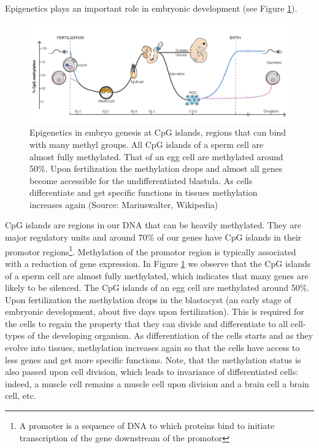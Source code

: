 \documentclass[
  11pt,
]{book}
\begin{document}
Epigenetics plays an important role in embryonic development (see Figure \ref{fig:epiEmbryo}).



\begin{figure}

{\centering \includegraphics[width=1\linewidth]{./figs/DNA_methylation_reprogramming} 

}

\caption{Epigenetics in embryo genesis at CpG islands, regions that can bind with many methyl groups. All CpG islands of a sperm cell are almost fully methylated. That of an egg cell are methylated around 50\%. Upon fertilization the methylation drops and almost all genes become accessible for the undifferentiated blastula. As cells differentiate and get specific functions in tissues methylation increases again (Source: Mariuswalter, Wikipedia)}\label{fig:epiEmbryo}
\end{figure}

CpG islands are regions in our DNA that can be heavily methylated. They are major regulatory units and around 70\% of our genes have CpG islands in their promotor regions\footnote{A promoter is a sequence of DNA to which proteins bind to initiate transcription of the gene downstream of the promotor}. Methylation of the promotor region is typically associated with a reduction of gene expression. In Figure \ref{fig:epiEmbryo} we observe that the CpG islands of a sperm cell are almost fully methylated, which indicates that many genes are likely to be silenced. The CpG islands of an egg cell are methylated around 50\%. Upon fertilization the methylation drops in the blastocyst (an early stage of embryonic development, about five days upon fertilization). This is required for the cells to regain the property that they can divide and differentiate to all cell-types of the developing organism. As differentiation of the cells starts and as they evolve into tissues, methylation increases again so that the cells have access to less genes and get more specific functions. Note, that the methylation status is also passed upon cell division, which leads to invariance of differentiated cells: indeed, a muscle cell remains a muscle cell upon division and a brain cell a brain cell, etc.
\end{document}
